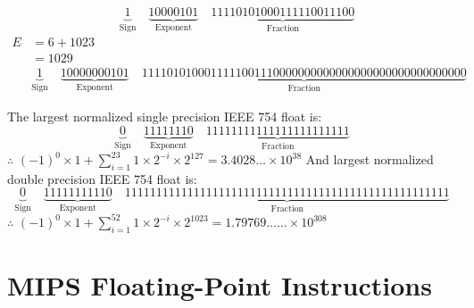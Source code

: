 \documentclass[12pt letter]{report}
\begin{document}
{{\begin{align*}
        & \underbrace{1}_{\text{Sign}} \quad
      \underbrace{1000 0101}_{\text{Exponent}} \quad
      \underbrace{11110101000111110011100}_{\text{Fraction}}
    \end{align*}
    \begin{align*}
      E & = 6 + 1023                         \\
        & = 1029                             \\
        & \underbrace{1}_{\text{Sign}} \quad
      \underbrace{100 0000 0101}_{\text{Exponent}} \quad
      \underbrace{1111010100011111001110000000000000000000000000000000}_{\text{Fraction}}
    \end{align*}
  }
}

The largest normalized single precision IEEE 754 float is:
\[
  \underbrace{0}_{\text{Sign}} \quad
  \underbrace{1111 1110}_{\text{Exponent}} \quad
  \underbrace{11111111111111111111111}_{\text{Fraction}}
\]
$\therefore$ $ \left( -1 \right)^{0} \times 1 + \sum_{i=1}^{23} 1\times 2^{-i} \times 2^{127} = 3.4028\ldots\times 10^{38} $
And largest normalized double precision IEEE 754 float is:
\[
  \underbrace{0}_{\text{Sign}} \quad
  \underbrace{111 1111 1110}_{\text{Exponent}} \quad
  \underbrace{1111111111111111111111111111111111111111111111111111}_{\text{Fraction}}
\]
$\therefore$ $ \left( -1 \right)^{0} \times 1 + \sum_{i=1}^{52} 1\times 2^{-i} \times 2^{1023} = 1.79769...\ldots\times 10^{308} $

\chapter{MIPS Floating-Point Instructions}


\end{document}

